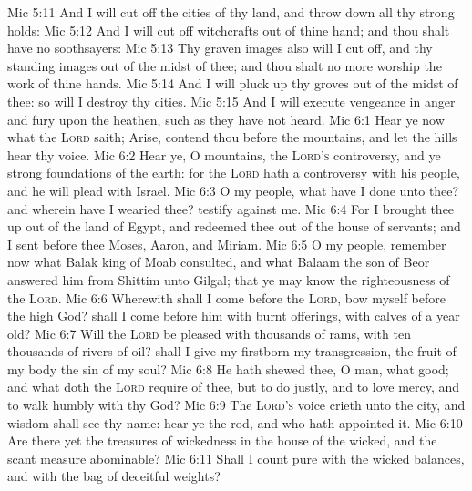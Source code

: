 \vs Mic 5:11 And I will cut off the cities of thy land, and throw down all thy strong holds:
\vs Mic 5:12 And I will cut off witchcrafts out of thine hand; and thou shalt have no  soothsayers:
\vs Mic 5:13 Thy graven images also will I cut off, and thy standing images out of the midst of thee; and thou shalt no more worship the work of thine hands.
\vs Mic 5:14 And I will pluck up thy groves out of the midst of thee: so will I destroy thy cities.
\vs Mic 5:15 And I will execute vengeance in anger and fury upon the heathen, such as they have not heard.
\vs Mic 6:1 Hear ye now what the \textsc{Lord} saith; Arise, contend thou before the mountains, and let the hills hear thy voice.
\vs Mic 6:2 Hear ye, O mountains, the \textsc{Lord's} controversy, and ye strong foundations of the earth: for the \textsc{Lord} hath a controversy with his people, and he will plead with Israel.
\vs Mic 6:3 O my people, what have I done unto thee? and wherein have I wearied thee? testify against me.
\vs Mic 6:4 For I brought thee up out of the land of Egypt, and redeemed thee out of the house of servants; and I sent before thee Moses, Aaron, and Miriam.
\vs Mic 6:5 O my people, remember now what Balak king of Moab consulted, and what Balaam the son of Beor answered him from Shittim unto Gilgal; that ye may know the righteousness of the \textsc{Lord}.
\vs Mic 6:6 Wherewith shall I come before the \textsc{Lord},  bow myself before the high God? shall I come before him with burnt offerings, with calves of a year old?
\vs Mic 6:7 Will the \textsc{Lord} be pleased with thousands of rams,  with ten thousands of rivers of oil? shall I give my firstborn  my transgression, the fruit of my body  the sin of my soul?
\vs Mic 6:8 He hath shewed thee, O man, what  good; and what doth the \textsc{Lord} require of thee, but to do justly, and to love mercy, and to walk humbly with thy God?
\vs Mic 6:9 The \textsc{Lord's} voice crieth unto the city, and  wisdom shall see thy name: hear ye the rod, and who hath appointed it.
\vs Mic 6:10 Are there yet the treasures of wickedness in the house of the wicked, and the scant measure  abominable?
\vs Mic 6:11 Shall I count  pure with the wicked balances, and with the bag of deceitful weights?
